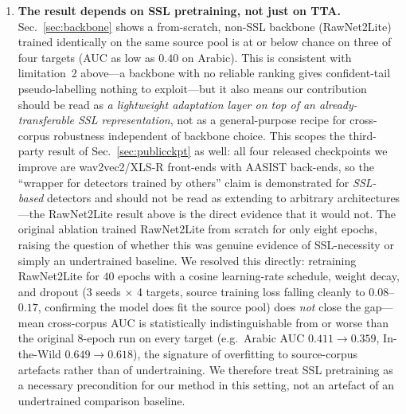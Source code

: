 \documentclass[conference]{IEEEtran}
\begin{document}
\begin{enumerate}
\item \textbf{The result depends on SSL pretraining, not just on TTA.}
Sec.~\ref{sec:backbone} shows a from-scratch, non-SSL backbone
(RawNet2Lite) trained identically on the same source pool is at or below
chance on three of four targets (AUC as low as $0.40$ on Arabic). This is
consistent with limitation~2 above---a backbone with no reliable ranking gives
confident-tail pseudo-labelling nothing to exploit---but it also means our
contribution should be read as \emph{a lightweight adaptation layer on top of
an already-transferable SSL representation}, not as a general-purpose recipe
for cross-corpus robustness independent of backbone choice. This scopes the
third-party result of Sec.~\ref{sec:publicckpt} as well: all four released
checkpoints we improve are wav2vec2/XLS-R front-ends with AASIST back-ends, so
the ``wrapper for detectors trained by others'' claim is demonstrated for
\emph{SSL-based} detectors and should not be read as extending to arbitrary
architectures---the RawNet2Lite result above is the direct evidence that it
would not. The original
ablation trained RawNet2Lite from scratch for only eight epochs, raising the
question of whether this was genuine evidence of SSL-necessity or simply an
undertrained baseline. We resolved this directly: retraining RawNet2Lite for
$40$ epochs with a cosine learning-rate schedule, weight decay, and dropout
(3 seeds $\times$ 4 targets, source training loss falling cleanly to
$0.08$--$0.17$, confirming the model does fit the source pool) does
\emph{not} close the gap---mean cross-corpus AUC is statistically
indistinguishable from or worse than the original 8-epoch run on every
target (e.g.\ Arabic AUC $0.411\!\to\!0.359$, In-the-Wild
$0.649\!\to\!0.618$), the signature of overfitting to source-corpus
artefacts rather than of undertraining. We therefore treat SSL pretraining
as a necessary precondition for our method in this setting, not an
artefact of an undertrained comparison baseline.


\end{enumerate}
\end{document}

